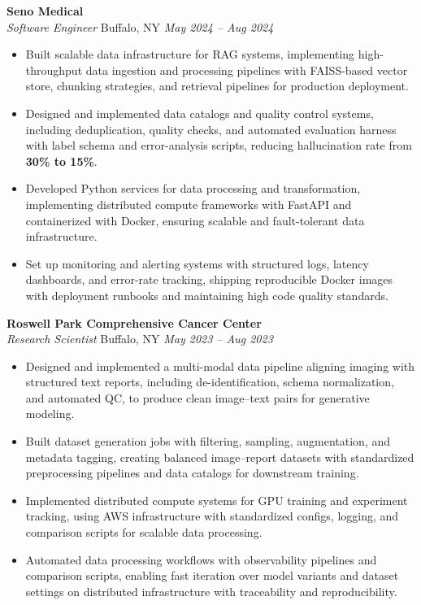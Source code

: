 \vspace*{-1pt}
\item \textbf{Seno Medical}\\
\textit{Software Engineer} \hfill Buffalo, NY \quad \textit{May 2024 -- Aug 2024}
\vspace*{-3pt}
\begin{itemize}[leftmargin=0.2in, topsep=1pt]
  \item Built scalable data infrastructure for RAG systems, implementing high-throughput data ingestion and processing pipelines with FAISS-based vector store, chunking strategies, and retrieval pipelines for production deployment.
  \item Designed and implemented data catalogs and quality control systems, including deduplication, quality checks, and automated evaluation harness with label schema and error-analysis scripts, reducing hallucination rate from \textbf{30\% to 15\%}.
  \item Developed Python services for data processing and transformation, implementing distributed compute frameworks with FastAPI and containerized with Docker, ensuring scalable and fault-tolerant data infrastructure.
  \item Set up monitoring and alerting systems with structured logs, latency dashboards, and error-rate tracking, shipping reproducible Docker images with deployment runbooks and maintaining high code quality standards.
\end{itemize}

\vspace*{-1pt}
\item \textbf{Roswell Park Comprehensive Cancer Center}\\
\textit{Research Scientist} \hfill Buffalo, NY \quad \textit{May 2023 -- Aug 2023}
\vspace*{-3pt}
\begin{itemize}[leftmargin=0.2in, topsep=1pt]
  \item Designed and implemented a multi-modal data pipeline aligning imaging with structured text reports, including de-identification, schema normalization, and automated QC, to produce clean image–text pairs for generative modeling.
  \item Built dataset generation jobs with filtering, sampling, augmentation, and metadata tagging, creating balanced image–report datasets with standardized preprocessing pipelines and data catalogs for downstream training.
  \item Implemented distributed compute systems for GPU training and experiment tracking, using AWS infrastructure with standardized configs, logging, and comparison scripts for scalable data processing.
  \item Automated data processing workflows with observability pipelines and comparison scripts, enabling fast iteration over model variants and dataset settings on distributed infrastructure with traceability and reproducibility.
\end{itemize}
